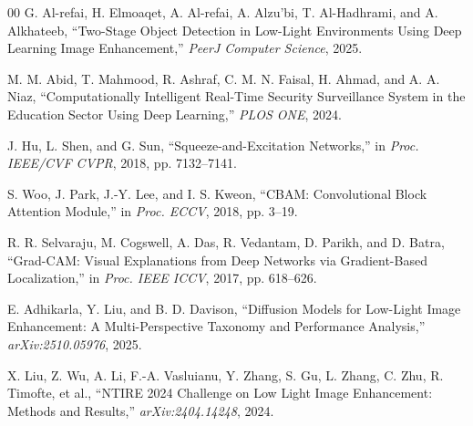 \documentclass[conference]{IEEEtran}
\begin{document}
\begin{thebibliography}{00}
G. Al-refai, H. Elmoaqet, A. Al-refai, A. Alzu'bi, T. Al-Hadhrami,
and A. Alkhateeb, ``Two-Stage Object Detection in Low-Light
Environments Using Deep Learning Image Enhancement,''
\textit{PeerJ Computer Science}, 2025.

M. M. Abid, T. Mahmood, R. Ashraf, C. M. N. Faisal, H. Ahmad, and
A. A. Niaz, ``Computationally Intelligent Real-Time Security
Surveillance System in the Education Sector Using Deep Learning,''
\textit{PLOS ONE}, 2024.

J. Hu, L. Shen, and G. Sun, ``Squeeze-and-Excitation Networks,''
in \textit{Proc. IEEE/CVF CVPR}, 2018, pp. 7132--7141.

S. Woo, J. Park, J.-Y. Lee, and I. S. Kweon, ``CBAM: Convolutional
Block Attention Module,'' in \textit{Proc. ECCV}, 2018, pp. 3--19.

R. R. Selvaraju, M. Cogswell, A. Das, R. Vedantam, D. Parikh, and
D. Batra, ``Grad-CAM: Visual Explanations from Deep Networks via
Gradient-Based Localization,'' in \textit{Proc. IEEE ICCV}, 2017,
pp. 618--626.

E. Adhikarla, Y. Liu, and B. D. Davison, ``Diffusion Models for
Low-Light Image Enhancement: A Multi-Perspective Taxonomy and
Performance Analysis,'' \textit{arXiv:2510.05976}, 2025.

X. Liu, Z. Wu, A. Li, F.-A. Vasluianu, Y. Zhang, S. Gu, L. Zhang,
C. Zhu, R. Timofte, et al., ``NTIRE 2024 Challenge on Low Light
Image Enhancement: Methods and Results,'' \textit{arXiv:2404.14248},
2024.

\end{thebibliography}

\balance
\end{document}
